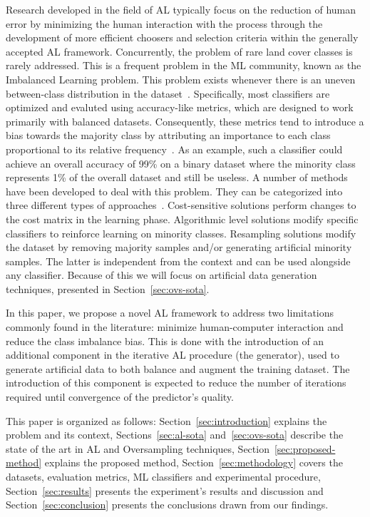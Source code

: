 \documentclass[preprint,12pt]{elsarticle}
\begin{document}
Research developed in the field of AL typically focus on the reduction of
human error by minimizing the human interaction with the process through the
development of more efficient choosers and selection criteria within the
generally accepted AL framework. Concurrently, the problem of rare land cover
classes is rarely addressed. This is a frequent problem in the ML community,
known as the Imbalanced Learning problem. This problem exists whenever there
is an uneven between-class distribution in the dataset~\cite{Chawla2004}.
Specifically, most classifiers are optimized and evaluted using accuracy-like
metrics, which are designed to work primarily with balanced datasets.
Consequently, these metrics tend to introduce a bias towards the majority
class by attributing an importance to each class proportional to its relative
frequency~\cite{Maxwell2018}. As an example, such a classifier could achieve
an overall accuracy of 99\% on a binary dataset where the minority class
represents 1\% of the overall dataset and still be useless. A number of
methods have been developed to deal with this problem. They can be categorized
into three different types of approaches~\cite{Fernandez2013,Kaur2019}.
Cost-sensitive solutions perform changes to the cost matrix in the learning
phase. Algorithmic level solutions modify specific classifiers to reinforce
learning on minority classes. Resampling solutions modify the dataset by
removing majority samples and/or generating artificial minority samples. The
latter is independent from the context and can be used alongside any
classifier. Because of this we will focus on artificial data generation
techniques, presented in Section~\ref{sec:ovs-sota}.

In this paper, we propose a novel AL framework to address two limitations
commonly found in the literature: minimize human-computer interaction and
reduce the class imbalance bias. This is done with the introduction of an
additional component in the iterative AL procedure (the generator), used to
generate artificial data to both balance and augment the training dataset. The
introduction of this component is expected to reduce the number of iterations
required until convergence of the predictor's quality.

This paper is organized as follows: Section~\ref{sec:introduction} explains
the problem and its context, Sections~\ref{sec:al-sota} and~\ref{sec:ovs-sota}
describe the state of the art in AL and Oversampling techniques,
Section~\ref{sec:proposed-method} explains the proposed method,
Section~\ref{sec:methodology} covers the datasets, evaluation metrics, ML
classifiers and experimental procedure, Section~\ref{sec:results} presents the
experiment's results and discussion and Section~\ref{sec:conclusion} presents
the conclusions drawn from our findings.
\end{document}
